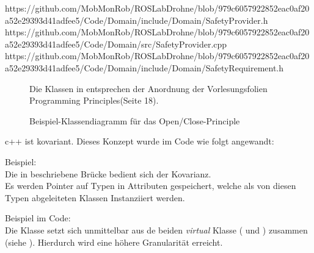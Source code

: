 https://github.com/MobMonRob/ROSLabDrohne/blob/979c6057922852eac0af20a52e29393d41adfee5/Code/Domain/include/Domain/SafetyProvider.h
https://github.com/MobMonRob/ROSLabDrohne/blob/979c6057922852eac0af20a52e29393d41adfee5/Code/Domain/src/SafetyProvider.cpp
https://github.com/MobMonRob/ROSLabDrohne/blob/979c6057922852eac0af20a52e29393d41adfee5/Code/Domain/include/Domain/SafetyRequirement.h

\begin{figure}[ht!]
\vspace{0.25cm}
\begin{center}
\caption{Beispiel-Klassendiagramm für das Open/Close-Principle}
\label{fig:OC}
\end{center}

\vspace{0.25cm}
Die Klassen in  entsprechen der Anordnung der Vorlesungsfolien \glqq Programming Principles\grqq (Seite 18).
\end{figure}


c++ ist kovariant. Dieses Konzept wurde im Code wie folgt angewandt:

Beispiel:\\
Die in  beschriebene Brücke bedient sich der Kovarianz.\\
Es werden Pointer auf Typen in Attributen gespeichert, welche als von diesen Typen abgeleiteten Klassen Instanziiert werden.



Beispiel im Code:\\
Die Klasse  setzt sich unmittelbar aus de beiden \textit{virtual} Klasse ( und ) zusammen (siehe ). Hierdurch wird eine höhere Granularität erreicht.

